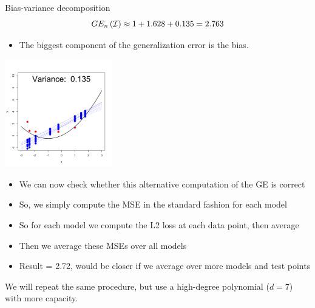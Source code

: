 \documentclass[11pt,compress,t,notes=noshow, xcolor=table]{beamer}
\begin{document}
\begin{vbframe} {Bias-variance decomposition}
$$GE_n\left(\mathcal{I}\right) \approx 1 + 1.628 + 0.135 = 2.763 $$


\begin{itemize}
  \item The biggest component of the generalization error is the bias.
\end{itemize}

\framebreak

\begin{center}
  \includegraphics[width = 0.35\textwidth]{figure/bias_variance_decomposition-linear_model_variance.png}
\end{center}

\begin{footnotesize}

\begin{itemize}
  \item We can now check whether this alternative computation of the GE is correct
  \item So, we simply compute the MSE in the standard fashion for each model
  \item So for each model we compute the L2 loss at each data point, then average
  \item Then we average these MSEs over all models
  \item Result = 2.72, would be closer if we average over more models and test points 
\end{itemize}

\end{footnotesize}


\framebreak


We will repeat the same procedure, but use a high-degree polynomial ($d=7$) with more capacity.


\end{vbframe}
\end{document}
